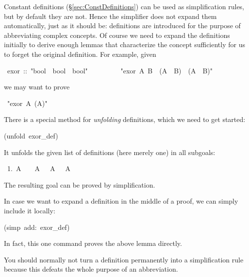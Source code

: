 \begin{isabelle}%
%
\begin{isamarkuptext}%
\noindent Constant definitions (\S\ref{sec:ConstDefinitions}) can
be used as simplification rules, but by default they are not.  Hence the
simplifier does not expand them automatically, just as it should be:
definitions are introduced for the purpose of abbreviating complex
concepts. Of course we need to expand the definitions initially to derive
enough lemmas that characterize the concept sufficiently for us to forget the
original definition. For example, given%
\end{isamarkuptext}%
\ exor\ ::\ {"}bool\ {\isasymRightarrow}\ bool\ {\isasymRightarrow}\ bool{"}\isanewline
\ \ \ \ \ \ \ \ \ {"}exor\ A\ B\ {\isasymequiv}\ (A\ {\isasymand}\ {\isasymnot}B)\ {\isasymor}\ ({\isasymnot}A\ {\isasymand}\ B){"}%
\begin{isamarkuptext}%
\noindent
we may want to prove%
\end{isamarkuptext}%
\ {"}exor\ A\ ({\isasymnot}A){"}%
\begin{isamarkuptxt}%
\noindent
There is a special method for \emph{unfolding} definitions, which we need to
get started:%
\end{isamarkuptxt}%
(unfold\ exor\_def)%
\begin{isamarkuptxt}%
\noindent
It unfolds the given list of definitions (here merely one) in all subgoals:
\begin{isabellepar}%
~1.~A~{\isasymand}~{\isasymnot}~{\isasymnot}~A~{\isasymor}~{\isasymnot}~A~{\isasymand}~{\isasymnot}~A%
\end{isabellepar}%
The resulting goal can be proved by simplification.

In case we want to expand a definition in the middle of a proof, we can
simply include it locally:%
\end{isamarkuptxt}%
(simp\ add:\ exor\_def)%
\begin{isamarkuptext}%
\noindent
In fact, this one command proves the above lemma directly.

You should normally not turn a definition permanently into a simplification
rule because this defeats the whole purpose of an abbreviation.%
\end{isamarkuptext}%
\end{isabelle}%
